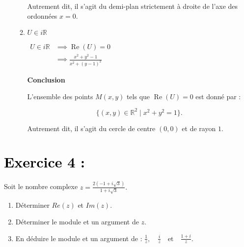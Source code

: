 \documentclass[12pt]{article}
\begin{document}
\begin{enumerate}
\begin{enumerate}
Autrement dit, il s’agit du demi-plan strictement à droite de l’axe des ordonnées \( x = 0 \).
        \item $U \in i\mathbb{R}$
        
$
\begin{aligned}
U \in i\mathbb{R} &\implies  \operatorname{Re}(U) = 0\\
											 &\implies \frac{x^2 + y^2 - 1}{x^2 + (y-1)^2}
\end{aligned}
$

\textbf{Conclusion}

L’ensemble des points \( M(x, y) \) tels que \( \operatorname{Re}(U) = 0 \) est donné par :

\[
\{ (x, y) \in \mathbb{R}^2 \mid x^2 + y^2 = 1 \}.
\]

Autrement dit, il s’agit du cercle de centre \( (0,0) \) et de rayon \( 1 \). 
    \end{enumerate}
\end{enumerate}
\section*{\textcolor{black}{Exercice 4 :}}
Soit le nombre complexe 
\(
z = \frac{2(-1 + i\sqrt{3})}{1 + i\sqrt{3}}.
\)

\begin{enumerate}
    \item Déterminer $Re(z)$ et $Im(z)$.
    \item Déterminer le module et un argument de $z$.
    \item En déduire le module et un argument de :
    \(
    \frac{1}{z}, \quad \frac{i}{z} \quad \text{et} \quad \frac{1 + i}{z}.
    \)
\end{enumerate}
\end{document}
